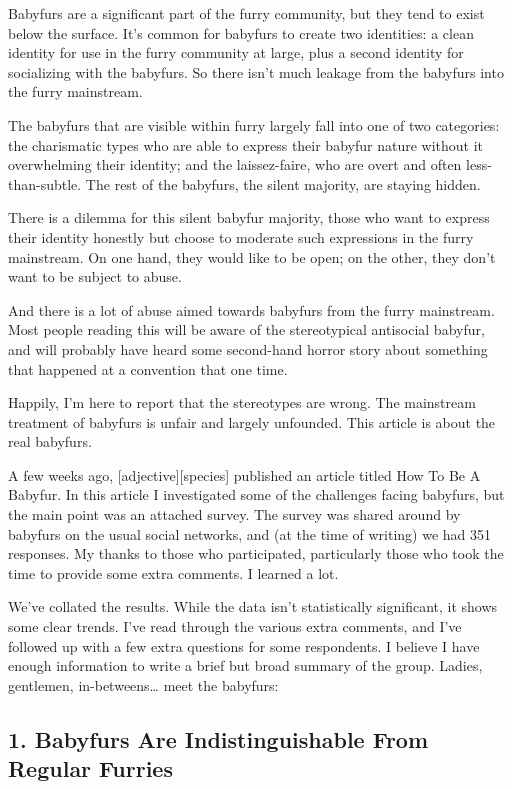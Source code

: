 
Babyfurs are a significant part of the furry community, but they tend to exist below the surface. It's common for babyfurs to create two identities: a clean identity for use in the furry community at large, plus a second identity for socializing with the babyfurs. So there isn't much leakage from the babyfurs into the furry mainstream.

The babyfurs that are visible within furry largely fall into one of two categories: the charismatic types who are able to express their babyfur nature without it overwhelming their identity; and the laissez-faire, who are overt and often less-than-subtle. The rest of the babyfurs, the silent majority, are staying hidden.

There is a dilemma for this silent babyfur majority, those who want to express their identity honestly but choose to moderate such expressions in the furry mainstream. On one hand, they would like to be open; on the other, they don't want to be subject to abuse.

And there is a lot of abuse aimed towards babyfurs from the furry mainstream. Most people reading this will be aware of the stereotypical antisocial babyfur, and will probably have heard some second-hand horror story about something that happened at a convention that one time.

Happily, I'm here to report that the stereotypes are wrong. The mainstream treatment of babyfurs is unfair and largely unfounded. This article is about the real babyfurs.

A few weeks ago, [adjective][species] published an article titled How To Be A Babyfur. In this article I investigated some of the challenges facing babyfurs, but the main point was an attached survey. The survey was shared around by babyfurs on the usual social networks, and (at the time of writing) we had 351 responses. My thanks to those who participated, particularly those who took the time to provide some extra comments. I learned a lot.

We've collated the results. While the data isn't statistically significant, it shows some clear trends. I've read through the various extra comments, and I've followed up with a few extra questions for some respondents. I believe I have enough information to write a brief but broad summary of the group. Ladies, gentlemen, in-betweens… meet the babyfurs:

\subsection*{1. Babyfurs Are Indistinguishable From Regular Furries}

